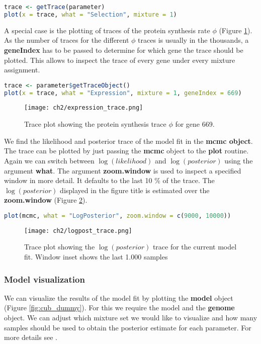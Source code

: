 \clearpage

\begin{lstlisting}[language=R]
trace <- getTrace(parameter)
plot(x = trace, what = "Selection", mixture = 1)
\end{lstlisting}


A special case is the plotting of traces of the protein synthesis rate $\phi$ (Figure \ref{fig:logphi_trace}). 
As the number of traces for the different $\phi$ traces is usually in the thousands, a \textbf{geneIndex} has to be passed to determine for which gene the trace should be plotted. 
This allows to inspect the trace of every gene under every mixture assignment.

\begin{lstlisting}[language=R]
trace <- parameter$getTraceObject()
plot(x = trace, what = "Expression", mixture = 1, geneIndex = 669)
\end{lstlisting}

\begin{figure}
  \centering
  \texttt{[image: ch2/expression\_trace.png]}\\
  \caption{Trace plot showing the protein synthesis trace $\phi$ for gene 669.}
  \label{fig:logphi_trace}
\end{figure} 

We find the likelihood and posterior trace of the model fit in the \textbf{mcmc object}. 
The trace can be plotted by just passing the \textbf{mcmc} object to the \textbf{plot} routine. 
Again we can switch between $\log(likelihood)$ and $\log(posterior)$ using the argument \textbf{what}. 
The argument \textbf{zoom.window} is used to inspect a specified window in more detail. 
It defaults to the last 10 \% of the trace. 
The $\log(posterior)$ displayed in the figure title is estimated over the \textbf{zoom.window} (Figure \ref{fig:logpost_trace}).

\begin{lstlisting}[language=R]
plot(mcmc, what = "LogPosterior", zoom.window = c(9000, 10000))
\end{lstlisting}


\begin{figure}
  \centering
  \texttt{[image: ch2/logpost\_trace.png]}\\
  \caption{Trace plot showing the $\log(posterior)$ trace for the current model fit. Window inset shows the last 1.000 samples}
  \label{fig:logpost_trace}
\end{figure} 

\subsubsection{Model visualization}
We can visualize the results of the model fit by plotting the \textbf{model} object (Figure \ref{fig:cub_dummy}). 
For this we require the model and the \textbf{genome} object. 
We can adjust which mixture set we would like to visualize and how many samples should be used to obtain the posterior estimate for each parameter. 
For more details see \citet{gilchrist2015}.

